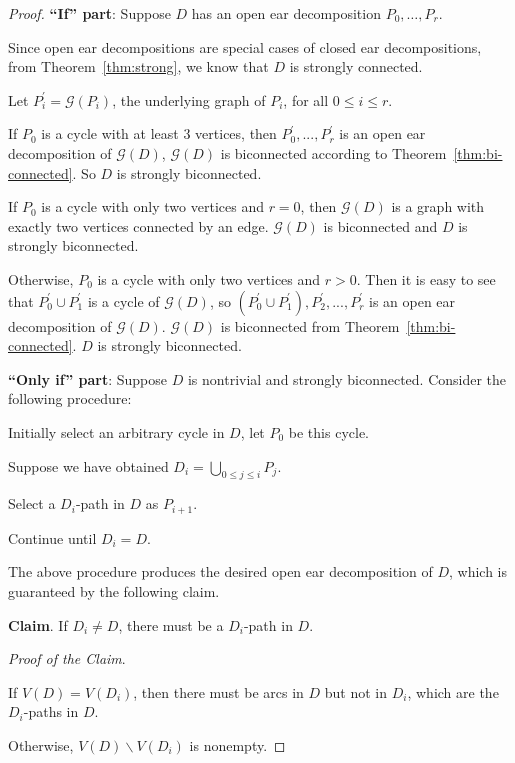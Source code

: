 \documentclass{article}
\begin{document}
\begin{proof}

\noindent \textbf{``If'' part}: Suppose $D$ has an open ear
decomposition $P_0,\dots,P_r$.

Since open ear decompositions are special cases of closed ear
decompositions, from Theorem~\ref{thm:strong}, we know that $D$ is
strongly connected.

Let $P^\prime_i=\mathcal{G}(P_i)$, the underlying graph of $P_i$,
for all $0 \le i \le r$.

If $P_0$ is a cycle with at least $3$ vertices, then
$P^\prime_0,...,P^\prime_r$ is an open ear decomposition of
$\mathcal{G}(D)$, $\mathcal{G}(D)$ is biconnected according to
Theorem~\ref{thm:bi-connected}. So $D$ is strongly biconnected.

If $P_0$ is a cycle with only two vertices and $r=0$, then
$\mathcal{G}(D)$ is a graph with exactly two vertices connected by
an edge. $\mathcal{G}(D)$ is biconnected and $D$ is strongly
biconnected.

Otherwise, $P_0$ is a cycle with only two vertices and $r > 0$. Then
it is easy to see that $P^\prime_0 \cup P^\prime_1$ is a cycle of
$\mathcal{G}(D)$, so $\left(P^\prime_0 \cup
P^\prime_1\right),P^\prime_2,...,P^\prime_r$ is an open ear
decomposition of $\mathcal{G}(D)$. $\mathcal{G}(D)$ is biconnected
from Theorem~\ref{thm:bi-connected}. $D$ is strongly biconnected.

\noindent \textbf{``Only if'' part}: Suppose $D$ is nontrivial and
strongly biconnected. Consider the following procedure:

Initially select an arbitrary cycle in $D$, let $P_0$ be this cycle.

Suppose we have obtained $D_i= \bigcup \limits_{0 \le j \le i} P_j$.

Select a $D_i$-path in $D$ as $P_{i+1}$.

Continue until $D_i=D$.

The above procedure produces the desired open ear decomposition of
$D$, which is guaranteed by the following claim.

\smallskip
\noindent \textbf{Claim}. If $D_i \neq D$, there must be a
$D_i$-path in $D$.
\smallskip

\noindent \emph{Proof of the Claim}.

If $V(D)=V(D_i)$, then there must be arcs in $D$ but not in $D_i$,
which are the $D_i$-paths in $D$.

Otherwise, $V(D) \backslash V(D_i)$ is nonempty.


\end{proof}
\end{document}
